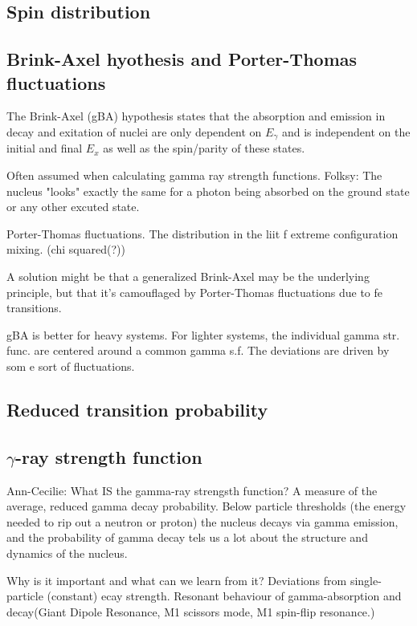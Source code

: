 \documentclass[%
 reprint,
 amsmath,amssymb,
 aps,
 norsk
]{revtex4-1}
\begin{document}

\subsection{Spin distribution}



\subsection{Brink-Axel hyothesis and Porter-Thomas fluctuations}
The Brink-Axel (gBA) hypothesis states that the absorption and emission in decay and exitation of nuclei are only dependent on $E_{\gamma}$ and is independent on the initial and final $E_x$ as well as the spin/parity of these states. 

Often assumed when calculating gamma ray strength functions. Folksy: The nucleus "looks" exactly the same for a photon being absorbed on the ground state or any other excuted state.


Porter-Thomas fluctuations. The distribution in the liit f extreme configuration mixing. (chi squared(?)) 

A solution might be that a generalized Brink-Axel may be the underlying principle, but that it's camouflaged by Porter-Thomas fluctuations due to fe transitions.

gBA is better for heavy systems. For lighter systems, the individual gamma str. func. are centered around a common gamma s.f. The deviations are driven by som e sort of fluctuations.



\subsection{Reduced transition probability}
\subsection{$\gamma$-ray strength function}

Ann-Cecilie: What IS the gamma-ray strengsth function? A measure of the average, reduced gamma decay probability. Below particle thresholds (the energy needed to rip out a neutron or proton) the nucleus decays via gamma emission, and the probability of gamma decay tels us a lot about the structure and dynamics of the nucleus.

Why is it important and what can we learn from it? Deviations from single-particle (constant) ecay strength. Resonant behaviour of gamma-absorption and decay(Giant Dipole Resonance, M1 scissors  mode, M1 spin-flip resonance.)
\end{document}
